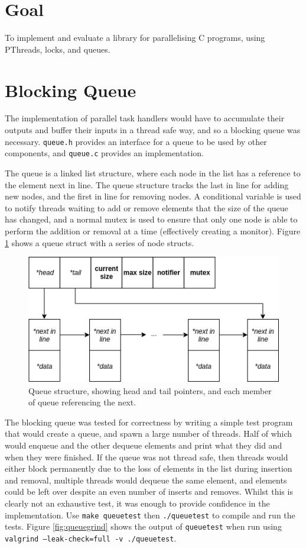 \documentclass[12pt]{article}
\def\code#1{\texttt{#1}}
\begin{document}
\section*{Goal}

To implement and evaluate a library for parallelising C programs, using PThreads, locks, and queues. 

\section{Blocking Queue}

The implementation of parallel task handlers would have to accumulate their outputs and buffer their inputs in a thread safe way, and so a blocking queue was necessary. \code{queue.h} provides an interface for a queue to be used by other components, and \code{queue.c} provides an implementation.

The queue is a linked list structure, where each node in the list has a reference to the element next in line. The queue structure tracks the last in line for adding new nodes, and the first in line for removing nodes. A conditional variable is used to notify threads waiting to add or remove elements that the size of the queue has changed, and a normal mutex is used to ensure that only one node is able to perform the addition or removal at a time (effectively creating a monitor). Figure \ref{fig:queue} shows a queue struct with a series of node structs.

\begin{figure}[!ht]
	\centering 
	\includegraphics[width=0.8\linewidth]{images/queue}
	\caption{Queue structure, showing head and tail pointers, and each member of queue referencing the next.}
	\label{fig:queue}
\end{figure}

The blocking queue was tested for correctness by writing a simple test program that would create a queue, and spawn a large number of threads. Half of which would enqueue and the other dequeue elements and print what they did and when they were finished. If the queue was not thread safe, then threads would either block permanently due to the loss of elements in the list during insertion and removal, multiple threads would dequeue the same element, and elements could be left over despite an even number of inserts and removes. Whilst this is clearly not an exhaustive test, it was enough to provide confidence in the implementation. Use \code{make queuetest} then \code{./queuetest} to compile and run the tests. Figure \ref{fig:queuegrind} shows the output of \code{queuetest} when run using \code{valgrind --leak-check=full -v ./queuetest}.
\end{document}

